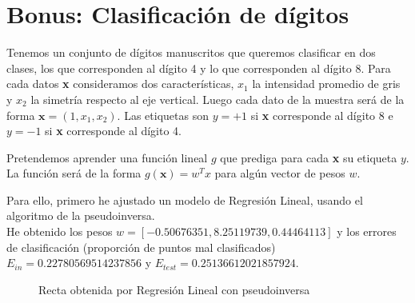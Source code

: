 \documentclass[a4]{article}
\begin{document}
\newpage
\section{Bonus: Clasificación de dígitos}

Tenemos un conjunto de dígitos manuscritos que queremos clasificar
en dos clases, los que corresponden al dígito 4 y lo que corresponden
al dígito 8. Para cada datos \textbf{x} consideramos dos características,
$x_1$ la intensidad promedio de gris y $x_2$ la simetría respecto
al eje vertical. Luego cada dato de la muestra será de la forma
$\textbf{x}=(1,x_1,x_2)$. Las etiquetas son $y=+1$ si \textbf{x}
corresponde al dígito 8 e $y=-1$ si \textbf{x} corresponde al dígito 4.

Pretendemos aprender una función lineal $g$ que prediga para cada \textbf{x}
su etiqueta $y$. La función será de la forma $g(\textbf{x})=w^Tx$
para algún vector de pesos $w$.

Para ello, primero he ajustado un modelo de Regresión Lineal, usando el algoritmo
de la pseudoinversa. \\ He obtenido los pesos $w= [-0.50676351,  8.25119739,  0.44464113]$
 y los errores de clasificación (proporción de puntos mal clasificados) $E_{in}=0.22780569514237856$ y $E_{test} = 0.25136612021857924$.

\begin{figure}[H]
    \centering
    \caption{Recta obtenida por Regresión Lineal con pseudoinversa}
    \label{fig:lin-regress}
\end{figure}
\vspace{-3mm}
\end{document}
